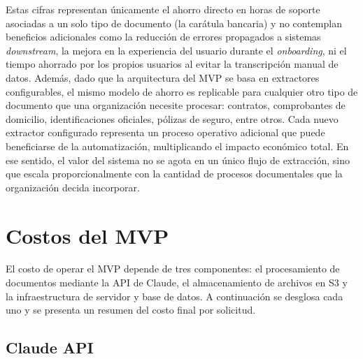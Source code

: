 Estas cifras representan únicamente el ahorro directo en horas de soporte asociadas a un solo tipo de documento (la carátula bancaria) y no contemplan beneficios adicionales como la reducción de errores propagados a sistemas \textit{downstream}, la mejora en la experiencia del usuario durante el \textit{onboarding}, ni el tiempo ahorrado por los propios usuarios al evitar la transcripción manual de datos. Además, dado que la arquitectura del MVP se basa en extractores configurables, el mismo modelo de ahorro es replicable para cualquier otro tipo de documento que una organización necesite procesar: contratos, comprobantes de domicilio, identificaciones oficiales, pólizas de seguro, entre otros. Cada nuevo extractor configurado representa un proceso operativo adicional que puede beneficiarse de la automatización, multiplicando el impacto económico total. En ese sentido, el valor del sistema no se agota en un único flujo de extracción, sino que escala proporcionalmente con la cantidad de procesos documentales que la organización decida incorporar.


\section{Costos del MVP}

El costo de operar el MVP depende de tres componentes: el procesamiento de documentos mediante la API de Claude, el almacenamiento de archivos en S3 y la infraestructura de servidor y base de datos. A continuación se desglosa cada uno y se presenta un resumen del costo final por solicitud.

\subsection{Claude API}

